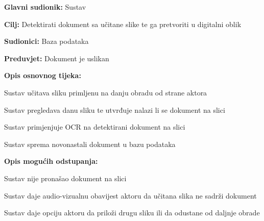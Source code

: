 					
					\noindent {}
					\begin{packed_item}
						
						\item \textbf{Glavni sudionik: } Sustav
						\item \textbf{Cilj:} Detektirati dokument sa učitane slike te ga pretvoriti u digitalni oblik
						\item \textbf{Sudionici:} Baza podataka
						\item \textbf{Preduvjet:} Dokument je uslikan
						\item \textbf{Opis osnovnog tijeka:}
						
						\item[] \begin{packed_enum}
							
							\item Sustav učitava sliku primljenu na danju obradu od strane aktora
							\item Sustav pregledava danu sliku te utvrđuje nalazi li se dokument na slici
							\item Sustav primjenjuje OCR na detektirani dokument na slici
							\item Sustav sprema novonastali dokument u bazu podataka
							
						\end{packed_enum}
						
						\item \textbf{Opis mogućih odstupanja:}
						
						\item[] \begin{packed_item}
							
							\item[2.a] Sustav nije pronašao dokument na slici
							\item[] \begin{packed_enum}
								
								\item Sustav daje audio-vizualnu obavijest aktoru da učitana slika ne sadrži dokument
								\item Sustav daje opciju aktoru da priloži drugu sliku ili da odustane od daljnje obrade
								
							\end{packed_enum}
							
						\end{packed_item}
						
					\end{packed_item}
					


